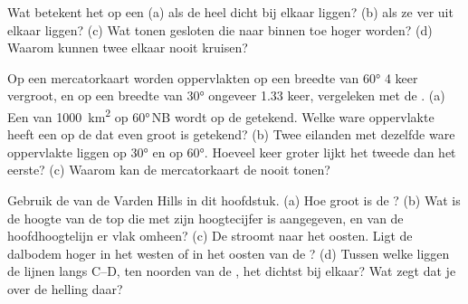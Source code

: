 \begin{exercise}[$\star$]\label{exo:g9:maps-of-the-earth:4}
Wat betekent het op een  (a) als de  heel
dicht bij elkaar liggen? (b) als ze ver uit elkaar liggen? (c) Wat tonen
gesloten  die naar binnen toe hoger worden? (d) Waarom kunnen
twee  elkaar nooit kruisen?
\end{exercise}

\begin{exercise}[$\star\star$]\label{exo:g9:maps-of-the-earth:5}
Op een mercatorkaart worden oppervlakten op een breedte van \ang{60}
4 keer vergroot, en op een breedte van \ang{30} ongeveer 1.33 keer,
vergeleken met de . (a) Een  van \qty{1000}{km^2} op
\ang{60}\,NB wordt op de  getekend. Welke ware oppervlakte heeft een
 op de  dat even groot is getekend? (b) Twee eilanden met
dezelfde ware oppervlakte liggen op \ang{30} en op \ang{60}. Hoeveel keer
groter lijkt het tweede dan het eerste? (c) Waarom kan de mercatorkaart de
 nooit tonen?
\end{exercise}

\begin{exercise}[$\star\star$]\label{exo:g9:maps-of-the-earth:6}
Gebruik de  van de Varden Hills in dit hoofdstuk.
(a) Hoe groot is de ? (b) Wat is de hoogte van de top die met
zijn hoogtecijfer is aangegeven, en van de hoofdhoogtelijn er vlak omheen?
(c) De  stroomt naar het oosten. Ligt de dalbodem hoger in het westen
of in het oosten van de ? (d) Tussen welke  liggen de
lijnen langs C--D, ten noorden van de , het dichtst bij elkaar? Wat
zegt dat je over de helling daar?
\end{exercise}

